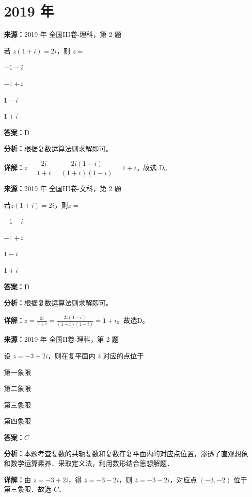 \section*{2019 年}

\begin{question}[points=5]
\textbf{来源：}2019 年 全国III卷-理科，第 2 题\par
若 $z(1+i)=2i$，则 $z=$
\begin{choices}
  \item $-1-i$
  \item $-1+i$
  \item $1-i$
  \item $1+i$
\end{choices}
\begin{solution}
\textbf{答案：}D

\textbf{分析：}根据复数运算法则求解即可。

\textbf{详解：}$z = \dfrac{2i}{1+i} = \dfrac{2i(1-i)}{(1+i)(1-i)} = 1+i$。故选 D。
\end{solution}
\end{question}

\begin{question}[points=5]
\textbf{来源：}2019 年 全国III卷-文科，第 2 题\par
若$z(1+i)=2i$，则$z=$
\begin{choices}
  \item $-1-i$
  \item $-1+i$
  \item $1-i$
  \item $1+i$
\end{choices}
\begin{solution}
\textbf{答案：}D

\textbf{分析：}根据复数运算法则求解即可。

\textbf{详解：}$z=\frac{2i}{1+i}=\frac{2i(1-i)}{(1+i)(1-i)}=1+i$。故选D。
\end{solution}
\end{question}

\begin{question}[points=5]
\textbf{来源：}2019 年 全国II卷-理科，第 2 题\par
设 $z=-3+2i$，则在复平面内 $\overline{z}$ 对应的点位于
\begin{choices}
  \item 第一象限
  \item 第二象限
  \item 第三象限
  \item 第四象限
\end{choices}
\begin{solution}
\textbf{答案：}$C$

\textbf{分析：}本题考查复数的共轭复数和复数在复平面内的对应点位置，渗透了直观想象和数学运算素养．采取定义法，利用数形结合思想解题．

\textbf{详解：}由 $z=-3+2i$，得 $\overline{z}=-3-2i$，则 $\overline{z}=-3-2i$，对应点 $(-3,-2)$ 位于第三象限．故选 $C$．
\end{solution}
\end{question}

